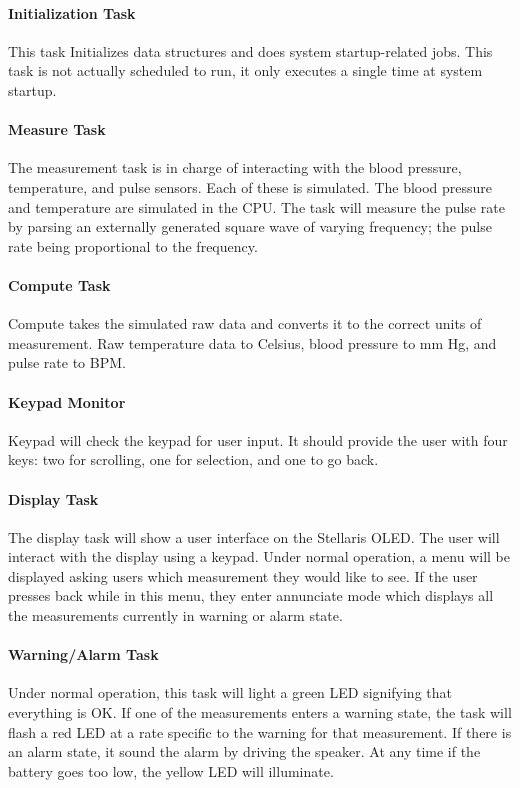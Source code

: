 \documentclass[12pt]{article} %
\begin{document}
    \paragraph{Initialization Task} This task Initializes data structures and does
    system startup-related jobs. This task is not actually scheduled to run, it
    only executes a single time at system startup.

    \paragraph{Measure Task} The measurement task is in charge of interacting with
    the blood pressure, temperature, and pulse sensors. Each of these is
    simulated. The blood pressure and temperature are simulated in the CPU. The
    task will measure the pulse rate by parsing an externally generated square wave
    of varying frequency; the pulse rate being proportional to the frequency.

    \paragraph{Compute Task} Compute takes the simulated raw data and converts it to the
    correct units of measurement. Raw temperature data to Celsius, blood pressure
    to mm Hg, and pulse rate to BPM.

    \paragraph{Keypad Monitor} Keypad will check the keypad for user input. It
    should provide the user with four keys: two for scrolling, one for selection,
    and one to go back.

    \paragraph{Display Task} The display task will show a user interface on the
    Stellaris OLED. The user will interact with the display using a keypad. Under
    normal operation, a menu will be displayed asking users which measurement they
    would like to see. If the user presses back while in this menu, they enter
    annunciate mode which displays all the measurements currently in warning or
    alarm state.

    \paragraph{Warning/Alarm Task} Under normal operation, this task will light a
    green LED signifying that everything is OK. If one of the measurements enters
    a warning state, the task will flash a red LED at a rate specific to the
    warning for that measurement. If there is an alarm state, it sound the alarm
    by driving the speaker. At any time if the battery goes too low, the yellow
    LED will illuminate.
\end{document}

